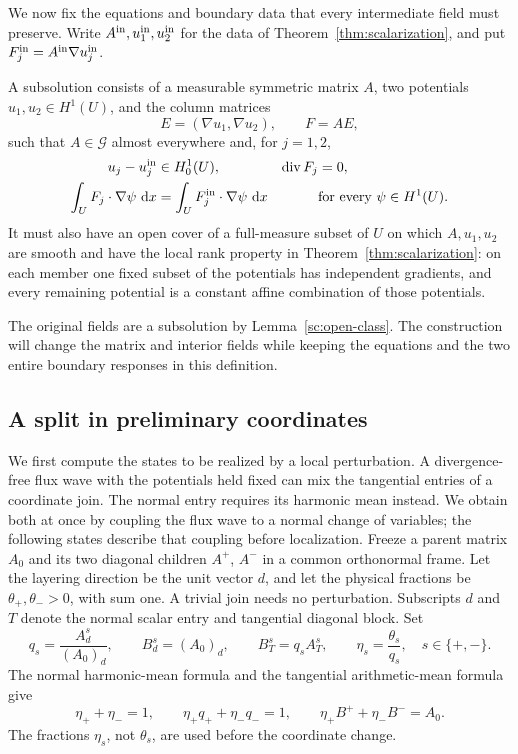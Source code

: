 We now fix the equations and boundary data that every intermediate
field must preserve. Write $A^{\rm in},u_1^{\rm in},u_2^{\rm in}$
for the data of Theorem~\ref{thm:scalarization}, and put
$F_j^{\rm in}=A^{\rm in}\nabla u_j^{\rm in}$.

\begin{definition}[Subsolution]\label{sc:subsolution}
A subsolution consists of a measurable symmetric matrix $A$, two
potentials $u_1,u_2\in H^1(U)$, and the column matrices
\[
 E=(\nabla u_1,\nabla u_2),\qquad F=AE,
\]
such that $A\in\mathcal G$ almost everywhere and, for $j=1,2$,
\begin{align*}
 u_j-u_j^{\rm in}&\in H^1_0(U),& \operatorname{div} F_j&=0,\\
 \int_U F_j\cdot\nabla\psi\,\,\mathrm d x
 &=\int_U F_j^{\rm in}\cdot\nabla\psi\,\,\mathrm d x
 &&\text{for every }\psi\in H^1(U).
\end{align*}
It must also have an open cover of a full-measure subset of $U$ on
which $A,u_1,u_2$ are smooth and have the local rank property in
Theorem~\ref{thm:scalarization}: on each member one fixed subset of
the potentials has independent gradients, and every remaining potential
is a constant affine combination of those potentials.
\end{definition}

The original fields are a subsolution by Lemma~\ref{sc:open-class}.
The construction will change the matrix and interior fields while keeping
the equations and the two entire boundary responses in this definition.

\subsection{A split in preliminary coordinates}

We first compute the states to be realized by a local perturbation.
A divergence-free flux wave with the potentials held fixed can mix the
tangential entries of a coordinate join. The normal entry requires its
harmonic mean instead. We obtain both at once by coupling the flux wave
to a normal change of variables; the following states describe that
coupling before localization.
Freeze a parent matrix $A_0$ and its two diagonal children $A^+$,
$A^-$ in a common orthonormal frame. Let the layering direction be
the unit vector $d$, and let the physical fractions be
$\theta_+,\theta_->0$, with sum one. A trivial join needs no
perturbation. Subscripts $d$ and $T$ denote the normal scalar entry
and tangential diagonal block. Set
\begin{equation}
 \label{sc:preliminary-states}
 q_s=\frac{A_d^s}{(A_0)_d},\qquad
 B_d^s=(A_0)_d,\qquad B_T^s=q_s A_T^s,
 \qquad \eta_s=\frac{\theta_s}{q_s},
 \quad s\in\{+,-\}.
\end{equation}
The normal harmonic-mean formula and the tangential arithmetic-mean
formula give
\begin{equation}
 \label{sc:means}
 \eta_++\eta_-=1,\qquad
 \eta_+q_++\eta_-q_-=1,\qquad
 \eta_+B^++\eta_-B^-=A_0.
\end{equation}
The fractions $\eta_s$, not $\theta_s$, are used before the
coordinate change.

